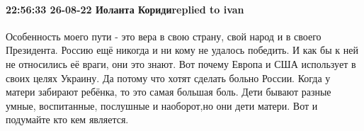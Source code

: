  
 
 
 
 

\paragraph{22:56:33 26-08-22 Иоланта Коридиreplied to ivan}

Особенность моего пути - это вера в свою страну, свой народ и в своего
Президента. Россию ещё никогда и ни кому не удалось победить. И как бы к ней не
относились её враги, они это знают. Вот почему Европа и США использует в своих
целях Украину. Да потому что хотят сделать больно России. Когда у матери
забирают ребёнка, то это самая большая боль. Дети бывают разные умные,
воспитанные, послушные и наоборот,но они дети матери. Вот и подумайте кто кем
является. 🙏
